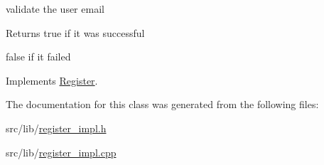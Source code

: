 validate the user email 

\begin{DoxyReturn}{Returns}
true if it was successful 

false if it failed 
\end{DoxyReturn}


Implements \hyperlink{classRegister_aeeb9ead57f749601459240fc68cfe7b4}{Register}.



The documentation for this class was generated from the following files\+:\begin{DoxyCompactItemize}
\item 
src/lib/\hyperlink{register__impl_8h}{register\+\_\+impl.\+h}\item 
src/lib/\hyperlink{register__impl_8cpp}{register\+\_\+impl.\+cpp}\end{DoxyCompactItemize}
